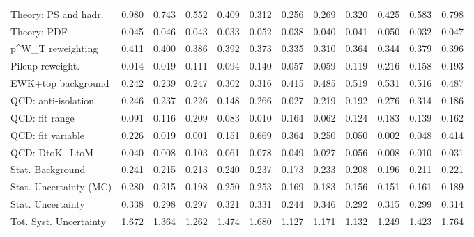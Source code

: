 \begin{tabular}{l|p{0.6cm}p{0.6cm}p{0.6cm}p{0.6cm}p{0.6cm}p{0.6cm}p{0.6cm}p{0.6cm}p{0.6cm}p{0.6cm}p{0.6cm}}
Theory: PS and hadr.                     & 0.980 & 0.743 & 0.552 & 0.409 & 0.312 & 0.256 & 0.269 & 0.320 & 0.425 & 0.583 & 0.798 \\
Theory: PDF                              & 0.045 & 0.046 & 0.043 & 0.033 & 0.052 & 0.038 & 0.040 & 0.041 & 0.050 & 0.032 & 0.047 \\
p^{W}_{T} reweighting                    & 0.411 & 0.400 & 0.386 & 0.392 & 0.373 & 0.335 & 0.310 & 0.364 & 0.344 & 0.379 & 0.396 \\
Pileup reweight.                         & 0.014 & 0.019 & 0.111 & 0.094 & 0.140 & 0.057 & 0.059 & 0.119 & 0.216 & 0.158 & 0.193 \\
EWK+top background                       & 0.242 & 0.239 & 0.247 & 0.302 & 0.316 & 0.415 & 0.485 & 0.519 & 0.531 & 0.516 & 0.487 \\
QCD: anti-isolation                      & 0.246 & 0.237 & 0.226 & 0.148 & 0.266 & 0.027 & 0.219 & 0.192 & 0.276 & 0.314 & 0.186 \\
QCD: fit range                           & 0.091 & 0.116 & 0.209 & 0.083 & 0.010 & 0.164 & 0.062 & 0.124 & 0.183 & 0.139 & 0.162 \\
QCD: fit variable                        & 0.226 & 0.019 & 0.001 & 0.151 & 0.669 & 0.364 & 0.250 & 0.050 & 0.002 & 0.048 & 0.414 \\
QCD: DtoK+LtoM                           & 0.040 & 0.008 & 0.103 & 0.061 & 0.078 & 0.049 & 0.027 & 0.056 & 0.008 & 0.010 & 0.031 \\
Stat. Background                         & 0.241 & 0.215 & 0.213 & 0.240 & 0.237 & 0.173 & 0.233 & 0.208 & 0.196 & 0.211 & 0.221 \\
Stat. Uncertainty (MC)                   & 0.280 & 0.215 & 0.198 & 0.250 & 0.253 & 0.169 & 0.183 & 0.156 & 0.151 & 0.161 & 0.189 \\
\hline
Stat. Uncertainty                        & 0.338 & 0.298 & 0.297 & 0.321 & 0.331 & 0.244 & 0.346 & 0.292 & 0.315 & 0.299 & 0.314 \\
\hline
Tot. Syst. Uncertainty                   & 1.672 & 1.364 & 1.262 & 1.474 & 1.680 & 1.127 & 1.171 & 1.132 & 1.249 & 1.423 & 1.764 \\
\hline
\end{tabular}
